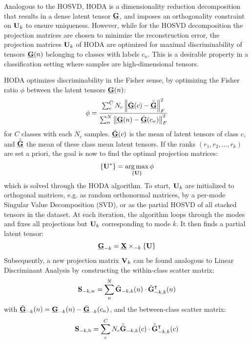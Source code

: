 Analogous to the HOSVD, HODA is a dimensionality
reduction decomposition that results in a dense latent tensor $\ten{G}$, and
imposes an orthogonality constraint on $\mat{U}_k$ to ensure uniqueness.
However, while for the HOSVD decomposition the projection matrices
are chosen to minimize the reconstruction error, the projection matrices
$\mat{U}_k$ of HODA are optimized for maximal discriminability of tensors
$\ten{G}(n)$ belonging to classes with labels $c_n$.
This is a desirable property in a classification setting where samples are
high-dimensional tensors.

HODA optimizes discriminability in the Fisher sense, by optimizing the
Fisher ratio $\phi$ between the latent tensors $\ten{G}(n)$:
\begin{equation}
	\phi = \frac{\sum_c^CN_c\left\lVert\bar{\ten{G}}(c)-\bar{\bar{\ten{G}}}\right\rVert_F^2}
	{\sum_n^N\left\lVert\ten{G}(n)-\bar{\ten{G}}(c_n)\right\rVert_F^2}
	\label{eq:fisher}
\end{equation}
for $C$ classes with each $N_c$ samples. $\bar{\ten{G}}(c)$ is the mean of
latent tensors of class $c$, and $\bar{\bar{\ten{G}}}$ the mean of
these class mean latent tensors.
If the ranks $(r_1,r_2, \ldots,r_k)$ are set a priori, the goal is now to find the optimal projection matrices:
\begin{equation}
	\left\{\mat{U}^*\right\} = \argmax_{\{\mat{U}\}}\phi
\end{equation}
which is solved through the HODA algorithm.
To start, $\mat{U}_k$ are initialized to orthogonal matrices, e.g. as random
orthonormal matrices, by a per-mode Singular Value Decomposition (SVD),
or as the partial HOSVD of all stacked tensors in the dataset.
At each iteration, the algorithm loops through the modes and fixes all
projections but $\mat{U}_k$ corresponding to mode $k$.
It then finds a partial latent tensor:
\begin{equation}
	\ten{G}_{-k}=\ten{X}\mmprs{\mat{U}}{k}
\end{equation}
Subsequently, a new projection matrix $\mat{V}_k$ can be found analogous to Linear
Discriminant Analysis by constructing the within-class scatter matrix:
\begin{equation}
	\mat{S}_{-k,\text{w}} = \sum_n^N\tilde{\mat{G}}_{-k,k}(n)\cdot\tilde{\mat{G}}_{-k,k}^\intercal(n)
\end{equation}
with $\tilde{\ten{G}}_{-k}(n) = \ten{G}_{-k}(n) - \bar{\ten{G}}_{-k}(c_n)$,
and the between-class scatter matrix:
\begin{equation}
	\mat{S}_{-k,\text{b}} =
	\sum_c^CN_c\tilde{\bar{\mat{G}}}_{-k,k}(c)\cdot\tilde{\bar{\mat{G}}}_{-k,k}^\intercal(c)
\end{equation}
